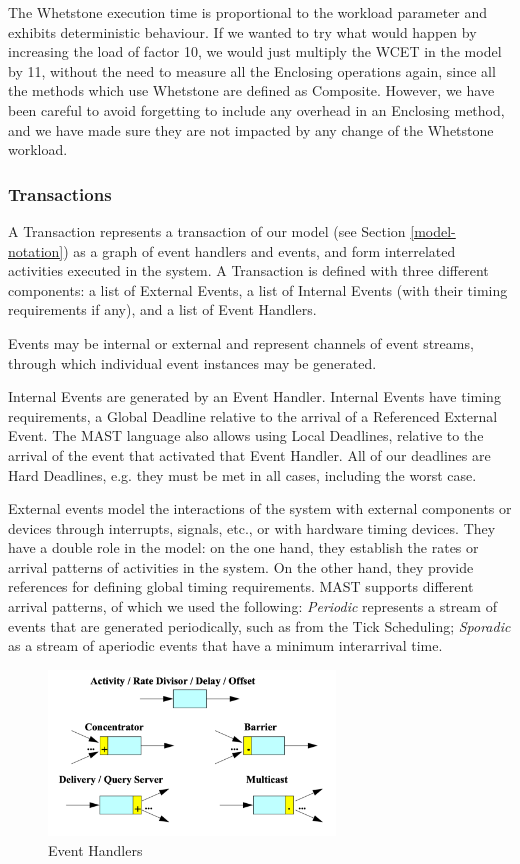 \documentclass{article}
\begin{document}
The Whetstone execution time is proportional to the workload parameter and exhibits deterministic behaviour. If we wanted to try what would happen by increasing the load of factor 10, we would just multiply the WCET in the model by 11, without the need to measure all the Enclosing operations again, since all the methods which use Whetstone are defined as Composite. However, we have been careful to avoid forgetting to include any overhead in an Enclosing method, and we have made sure they are not impacted by any change of the Whetstone workload.

\subsubsection{Transactions}

A Transaction represents a transaction of our model (see Section \ref{model-notation}) as a graph of event handlers and events, and form interrelated activities executed in the system. A Transaction is defined with three different components: a list of External Events, a list of Internal Events (with their timing requirements if any), and a list of Event Handlers.

Events may be internal or external and represent channels of event streams, through which individual event instances may be generated.

Internal Events are generated by an Event Handler. Internal Events have timing requirements, a Global Deadline relative to the arrival of a Referenced External Event. The MAST language also allows using Local Deadlines, relative to the arrival of the event that activated that Event Handler. All of our deadlines are Hard Deadlines, e.g. they must be met in all cases, including the worst case.

External events model the interactions of the system with external components or devices through interrupts, signals, etc., or with hardware timing devices. They have a double role in the model: on the one hand, they establish the rates or arrival patterns of activities in the system. On the other hand, they provide references for defining global timing requirements. MAST supports different arrival patterns, of which we used the following: \textit{Periodic} represents a stream of events that are generated periodically, such as from the Tick Scheduling; \textit{Sporadic} as a stream of aperiodic events that have a minimum interarrival time.

\begin{figure}[!htbp]
\centering
\includegraphics[width=3in]{images/event-handlers}
\caption{Event Handlers}
\label{event-handlers}
\end{figure}
\end{document}
